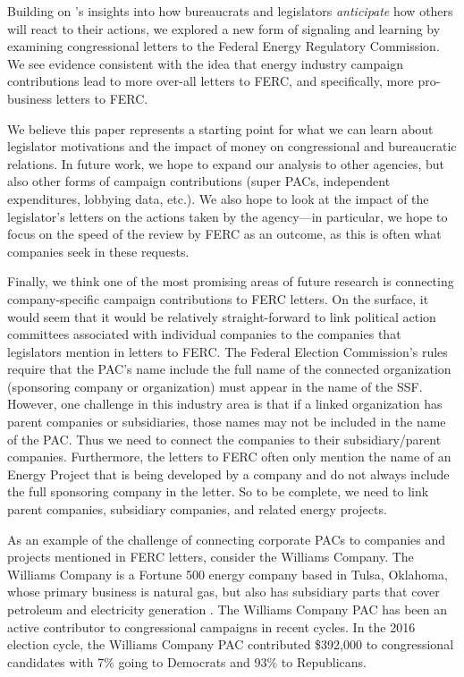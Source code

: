 \documentclass{article}
\begin{document}
Building on \citet{Arnold1979}'s insights into how bureaucrats and legislators \emph{anticipate} how others will react to their actions, we explored a new form of signaling and learning by examining congressional letters to the Federal Energy Regulatory Commission.  We see evidence consistent with the idea that energy industry campaign contributions lead to more over-all letters to FERC, and specifically, more pro-business letters to FERC.  

We believe this paper represents a starting point for what we can learn about legislator motivations and the impact of money on congressional and bureaucratic relations.  In future work, we hope to expand our analysis to other agencies, but also other forms of campaign contributions (super PACs, independent expenditures, lobbying data, etc.).  We also hope to look at the impact of the legislator's letters on the actions taken by the agency---in particular, we hope to focus on the speed of the review by FERC as an outcome, as this is often what companies seek in these requests. 

Finally, we think one of the most promising areas of future research is connecting company-specific campaign contributions to FERC letters. On the surface, it would seem that it would be relatively straight-forward to link political action committees associated with individual companies to the companies that legislators mention in letters to FERC. The Federal Election Commission's rules require that the PAC's name include the full name of the connected organization (sponsoring company or organization) must appear in the name of the SSF. However, one challenge in this industry area is that if a linked organization has parent companies or subsidiaries, those names may not be included in the name of the PAC. Thus we need to connect the companies to their subsidiary/parent companies.  Furthermore, the letters to FERC often only mention the name of an Energy Project that is being developed by a company and do not always include the full sponsoring company in the letter.  So to be complete, we need to link parent companies, subsidiary companies, and related energy projects.  

As an example of the challenge of connecting corporate PACs to companies and projects mentioned in FERC letters, consider the Williams Company. The Williams Company is a Fortune 500 energy company based in Tulsa, Oklahoma, whose primary business is natural gas, but also has subsidiary parts that cover petroleum and electricity generation \citep{BloombergWilliams2019}.  The Williams Company PAC has been an active contributor to congressional campaigns in recent cycles.  In the 2016 election cycle, the Williams Company PAC contributed \$392,000 to congressional candidates with 7\% going to Democrats and 93\% to Republicans.  
\end{document}
